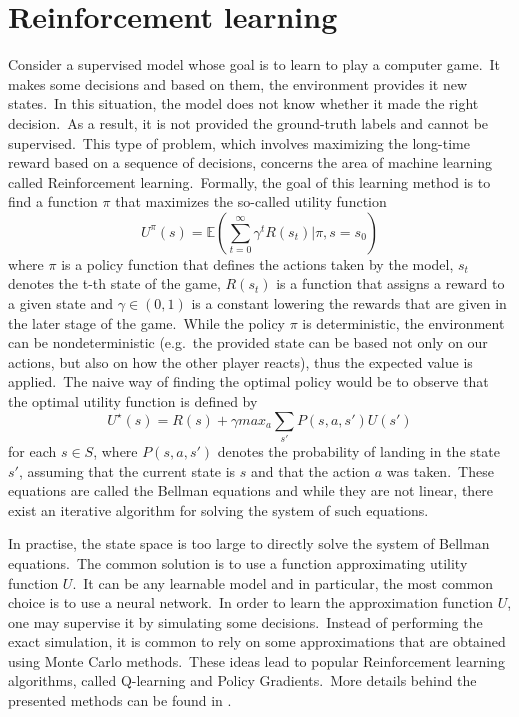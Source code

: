 \documentclass[longabstract, english, mgr]{iithesis}
\theoremstyle{default_theorem_style}\newtheorem{theorem}{Theorem}
\theoremstyle{default_theorem_style}\newtheorem{definition}{Definition}
\begin{document}
\section{Reinforcement learning}\label{sec:reinforcement_learning}

Consider a supervised model whose goal is to learn to play a computer game.\ It makes some decisions and based
on them, the environment provides it new states.\ In this situation, the model does not know whether it made the
right decision.\ As a result, it is not provided the ground-truth labels and cannot be supervised.\ This type of
problem, which involves maximizing the long-time reward based on a sequence of decisions, concerns the area of machine
learning called Reinforcement learning.\ Formally, the goal of this learning method is to find a function $\pi$ that
maximizes the so-called utility function
$$
U^{\pi}(s) = \mathbb{E}(\sum_{t=0}^{\infty} \gamma^t R(s_t) | \pi, s = s_0)
$$
where $\pi$ is a policy function that defines the actions taken by the model, $s_t$ denotes the t-th state
of the game, $R(s_t)$ is a function that assigns a reward to a given state and $\gamma \in (0, 1)$ is a constant
lowering the rewards that are given in the later stage of the game.\ While the policy $\pi$ is deterministic,
the environment can be nondeterministic (e.g.\ the provided state can be based not only on our actions, but also on
how the other player reacts), thus the expected value is applied.\ The naive way of finding the optimal policy would
be to observe that the optimal utility function is defined by
$$
U^{\star}(s) = R(s) + \gamma max_a \sum_{s'} P(s, a, s') U(s')
$$
for each $s \in S$, where $P(s, a, s')$ denotes the probability of landing in the state $s'$, assuming that the
current state is $s$ and that the action $a$ was taken.\ These equations are called the Bellman equations and while
they are not linear, there exist an iterative algorithm for solving the system of such equations.\newline

\noindent In practise, the state space is too large to directly solve the system of Bellman equations.\ The common
solution is to use a function approximating utility function $U$.\ It can be any learnable model and in
particular, the most common choice is to use a neural network.\ In order to learn the approximation function $U$, one
may supervise it by simulating some decisions.\ Instead of performing the exact simulation, it is common to rely on
some approximations that are obtained using Monte Carlo methods.\ These ideas lead to popular Reinforcement learning
algorithms, called Q-learning and Policy Gradients.\ More details behind the presented methods can be
found in \cite{reinforcement_learning_book}.
\end{document}
